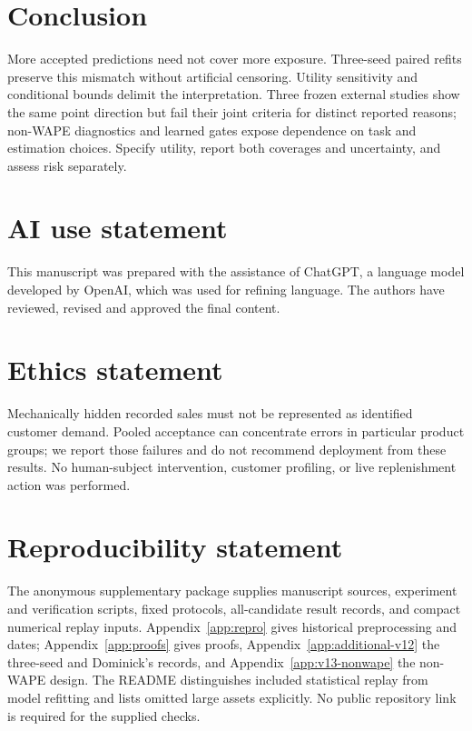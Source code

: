 \documentclass{article}
\begin{document}
\section{Conclusion}
More accepted predictions need not cover more exposure. Three-seed paired refits preserve this mismatch without artificial censoring. Utility sensitivity and conditional bounds delimit the interpretation. Three frozen external studies show the same point direction but fail their joint criteria for distinct reported reasons; non-WAPE diagnostics and learned gates expose dependence on task and estimation choices. Specify utility, report both coverages and uncertainty, and assess risk separately.

\label{end:main}

\clearpage
\section*{AI use statement}
This manuscript was prepared with the assistance of ChatGPT, a language model developed by OpenAI, which was used for refining language. The authors have reviewed, revised and approved the final content.

\section*{Ethics statement}
Mechanically hidden recorded sales must not be represented as identified customer demand. Pooled acceptance can concentrate errors in particular product groups; we report those failures and do not recommend deployment from these results. No human-subject intervention, customer profiling, or live replenishment action was performed.

\section*{Reproducibility statement}
The anonymous supplementary package supplies manuscript sources, experiment and verification scripts, fixed protocols, all-candidate result records, and compact numerical replay inputs. Appendix~\ref{app:repro} gives historical preprocessing and dates; Appendix~\ref{app:proofs} gives proofs, Appendix~\ref{app:additional-v12} the three-seed and Dominick's records, and Appendix~\ref{app:v13-nonwape} the non-WAPE design. The README distinguishes included statistical replay from model refitting and lists omitted large assets explicitly. No public repository link is required for the supplied checks.
\end{document}
